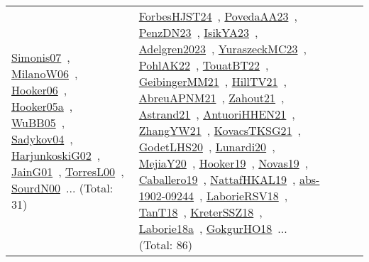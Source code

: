 {\begin{longtable}{lp{3cm}>{\raggedright\arraybackslash}p{6cm}>{\raggedright\arraybackslash}p{6cm}>{\raggedright\arraybackslash}p{8cm}}
\href{../works/Simonis07.pdf}{Simonis07}~\cite{Simonis07}, \href{../works/MilanoW06.pdf}{MilanoW06}~\cite{MilanoW06}, \href{../works/Hooker06.pdf}{Hooker06}~\cite{Hooker06}, \href{../works/Hooker05a.pdf}{Hooker05a}~\cite{Hooker05a}, \href{../works/WuBB05.pdf}{WuBB05}~\cite{WuBB05}, \href{../works/Sadykov04.pdf}{Sadykov04}~\cite{Sadykov04}, \href{../works/HarjunkoskiG02.pdf}{HarjunkoskiG02}~\cite{HarjunkoskiG02}, \href{../works/JainG01.pdf}{JainG01}~\cite{JainG01}, \href{../works/TorresL00.pdf}{TorresL00}~\cite{TorresL00}, \href{../works/SourdN00.pdf}{SourdN00}~\cite{SourdN00}... (Total: 31) & \href{../works/ForbesHJST24.pdf}{ForbesHJST24}~\cite{ForbesHJST24}, \href{../works/PovedaAA23.pdf}{PovedaAA23}~\cite{PovedaAA23}, \href{../works/PenzDN23.pdf}{PenzDN23}~\cite{PenzDN23}, \href{../works/IsikYA23.pdf}{IsikYA23}~\cite{IsikYA23}, \href{../works/Adelgren2023.pdf}{Adelgren2023}~\cite{Adelgren2023}, \href{../works/YuraszeckMC23.pdf}{YuraszeckMC23}~\cite{YuraszeckMC23}, \href{../works/PohlAK22.pdf}{PohlAK22}~\cite{PohlAK22}, \href{../works/TouatBT22.pdf}{TouatBT22}~\cite{TouatBT22}, \href{../works/GeibingerMM21.pdf}{GeibingerMM21}~\cite{GeibingerMM21}, \href{../works/HillTV21.pdf}{HillTV21}~\cite{HillTV21}, \href{../works/AbreuAPNM21.pdf}{AbreuAPNM21}~\cite{AbreuAPNM21}, \href{../works/Zahout21.pdf}{Zahout21}~\cite{Zahout21}, \href{../works/Astrand21.pdf}{Astrand21}~\cite{Astrand21}, \href{../works/AntuoriHHEN21.pdf}{AntuoriHHEN21}~\cite{AntuoriHHEN21}, \href{../works/ZhangYW21.pdf}{ZhangYW21}~\cite{ZhangYW21}, \href{../works/KovacsTKSG21.pdf}{KovacsTKSG21}~\cite{KovacsTKSG21}, \href{../works/GodetLHS20.pdf}{GodetLHS20}~\cite{GodetLHS20}, \href{../works/Lunardi20.pdf}{Lunardi20}~\cite{Lunardi20}, \href{../works/MejiaY20.pdf}{MejiaY20}~\cite{MejiaY20}, \href{../works/Hooker19.pdf}{Hooker19}~\cite{Hooker19}, \href{../works/Novas19.pdf}{Novas19}~\cite{Novas19}, \href{../works/Caballero19.pdf}{Caballero19}~\cite{Caballero19}, \href{../works/NattafHKAL19.pdf}{NattafHKAL19}~\cite{NattafHKAL19}, \href{../works/abs-1902-09244.pdf}{abs-1902-09244}~\cite{abs-1902-09244}, \href{../works/LaborieRSV18.pdf}{LaborieRSV18}~\cite{LaborieRSV18}, \href{../works/TanT18.pdf}{TanT18}~\cite{TanT18}, \href{../works/KreterSSZ18.pdf}{KreterSSZ18}~\cite{KreterSSZ18}, \href{../works/Laborie18a.pdf}{Laborie18a}~\cite{Laborie18a}, \href{../works/GokgurHO18.pdf}{GokgurHO18}~\cite{GokgurHO18}... (Total: 86)\\

\end{longtable}}
